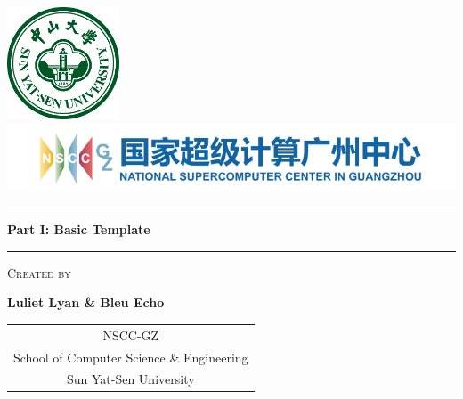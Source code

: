 \documentclass[8pt]{report}
\makeatletter
\newcommand{\studentname}{Luliet Lyan \& Bleu Echo}
\newcommand{\researchcentre}{NSCC-GZ}
\newcommand{\partonetitle}{Part I: Basic Template}
\renewenvironment{titlepage}{%
  \cleardoublepage
  \if@twocolumn
    \@restonecoltrue\onecolumn
  \else
    \@restonecolfalse\newpage
  \fi
  \thispagestyle{empty}%
}{%
  \if@restonecol\twocolumn \else \newpage \fi
}
\makeatother
\begin{document}
\begin{multicols}{2}

\newpage
\tableofcontents
\newpage

\end{multicols}

\begin{titlepage}
    \centering
    
    \vspace{1cm}
	\includegraphics[width=0.25\textwidth]{figures/SYSU.pdf}
    \includegraphics[width=1.0\textwidth]{figures/NSCC-GZ.pdf}
    \vspace{1cm}

    \begin{minipage}{1.0\textwidth}
        \centering

		\rule{\textwidth}{3pt}
		\vspace{0.5cm}

        \fontsize{28}{30}\bfseries
        \partonetitle

		\vspace{0.5cm}
		\rule{\textwidth}{3pt}
    \end{minipage}

    \vspace{0.8cm}
    
	\setlength{\fboxrule}{2pt} %
	\setlength{\fboxsep}{1cm}  %
	\begin{minipage}{0.75\textwidth} %
		\centering
		\vspace{1.3cm}

		\fontsize{14}{16}\selectfont
		\textsc{Created by} %
		
		\vspace{0.8cm}
		\fontsize{20}{24}\selectfont
		\textbf{\studentname}
		
		\vspace{0.8cm}
		\fontsize{12}{14}\selectfont
		\begin{tabular}{c}
			\researchcentre \\
			School of Computer Science \& Engineering \\
			Sun Yat-Sen University
		\end{tabular}
	

\end{minipage}
\end{titlepage}
\end{document}
